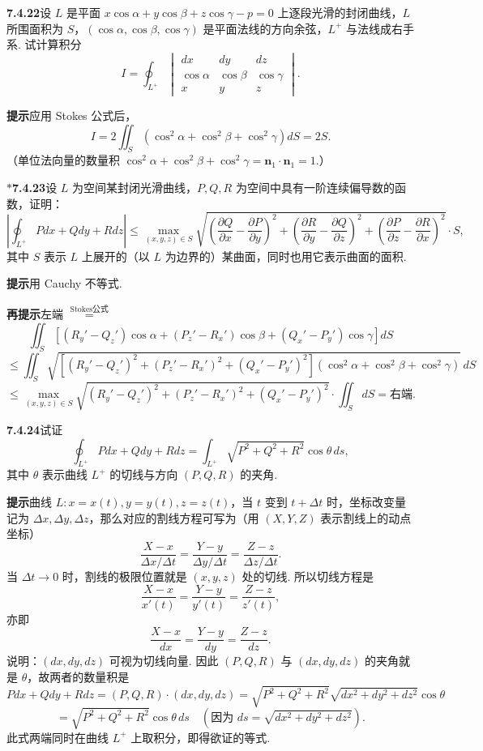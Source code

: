 \documentclass[UTF8,12pt,a4paper,fontset=fandol]{ctexart}
\providecommand{\xlongequal}[1]{\overset{#1}{=}}
\begin{document}
\noindent\textbf{7.4.22}\quad 设 $L$ 是平面 $x\cos\alpha+y\cos\beta+z\cos\gamma-p=0$ 上逐段光滑的封闭曲线，$L$ 所围面积为 $S$，$(\cos\alpha,\cos\beta,\cos\gamma)$ 是平面法线的方向余弦，$L^+$ 与法线成右手系. 试计算积分
\[
I=\oint_{L^+}
\begin{vmatrix}
dx & dy & dz\\
\cos\alpha & \cos\beta & \cos\gamma\\
x & y & z
\end{vmatrix}.
\]

\noindent\textbf{提示}\quad 应用 Stokes 公式后，
\[
I=2\iint_S(\cos^2\alpha+\cos^2\beta+\cos^2\gamma)dS=2S.
\]
（单位法向量的数量积 $\cos^2\alpha+\cos^2\beta+\cos^2\gamma=\mathbf n_1\cdot\mathbf n_1=1$.）

\noindent\textbf{$*$7.4.23}\quad 设 $L$ 为空间某封闭光滑曲线，$P,Q,R$ 为空间中具有一阶连续偏导数的函数，证明：
\[
\left|\oint_{L^+}Pdx+Qdy+Rdz\right|
\le\max_{(x,y,z)\in S}
\sqrt{\left(\frac{\partial Q}{\partial x}-\frac{\partial P}{\partial y}\right)^2
+\left(\frac{\partial R}{\partial y}-\frac{\partial Q}{\partial z}\right)^2
+\left(\frac{\partial P}{\partial z}-\frac{\partial R}{\partial x}\right)^2}\cdot S,
\]
其中 $S$ 表示 $L$ 上展开的（以 $L$ 为边界的）某曲面，同时也用它表示曲面的面积.

\noindent\textbf{提示}\quad 用 Cauchy 不等式.

\noindent\textbf{再提示}\quad 左端 $\xlongequal{\text{Stokes公式}}$
\[
\iint_S[(R_y'-Q_z')\cos\alpha+(P_z'-R_x')\cos\beta+(Q_x'-P_y')\cos\gamma]dS
\]
\[
\le\iint_S\sqrt{[(R_y'-Q_z')^2+(P_z'-R_x')^2+(Q_x'-P_y')^2](\cos^2\alpha+\cos^2\beta+\cos^2\gamma)}\,dS
\]
\[
\le\max_{(x,y,z)\in S}\sqrt{(R_y'-Q_z')^2+(P_z'-R_x')^2+(Q_x'-P_y')^2}\cdot\iint_SdS=\text{右端}.
\]

\noindent\textbf{7.4.24}\quad 试证
\[
\oint_{L^+}Pdx+Qdy+Rdz=\int_{L^+}\sqrt{P^2+Q^2+R^2}\cos\theta\,ds,
\]
其中 $\theta$ 表示曲线 $L^+$ 的切线与方向 $(P,Q,R)$ 的夹角.

\noindent\textbf{提示}\quad 曲线 $L:x=x(t),y=y(t),z=z(t)$，当 $t$ 变到 $t+\Delta t$ 时，坐标改变量记为 $\Delta x,\Delta y,\Delta z$，那么对应的割线方程可写为（用 $(X,Y,Z)$ 表示割线上的动点坐标）
\[
\frac{X-x}{\Delta x/\Delta t}=\frac{Y-y}{\Delta y/\Delta t}=\frac{Z-z}{\Delta z/\Delta t}.
\]
当 $\Delta t\to0$ 时，割线的极限位置就是 $(x,y,z)$ 处的切线. 所以切线方程是
\[
\frac{X-x}{x'(t)}=\frac{Y-y}{y'(t)}=\frac{Z-z}{z'(t)},
\]
亦即
\[
\frac{X-x}{dx}=\frac{Y-y}{dy}=\frac{Z-z}{dz}.
\]
说明：$(dx,dy,dz)$ 可视为切线向量. 因此 $(P,Q,R)$ 与 $(dx,dy,dz)$ 的夹角就是 $\theta$，故两者的数量积是
\[
Pdx+Qdy+Rdz=(P,Q,R)\cdot(dx,dy,dz)
=\sqrt{P^2+Q^2+R^2}\sqrt{dx^2+dy^2+dz^2}\cos\theta
\]
\[
=\sqrt{P^2+Q^2+R^2}\cos\theta\,ds
\quad(\text{因为 }ds=\sqrt{dx^2+dy^2+dz^2}).
\]
此式两端同时在曲线 $L^+$ 上取积分，即得欲证的等式.
\end{document}
